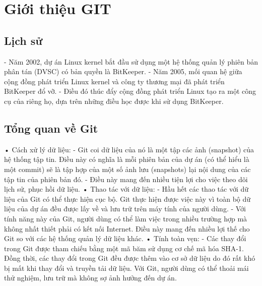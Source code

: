 \documentclass[12pt,a4paper]{report}
\begin{document}
\chapter{Giới thiệu GIT}


\section{Lịch sử}


\hspace{0.6cm}- Năm 2002, dự án Linux kernel bắt đầu sử dụng một hệ thống quản lý phiên bản phân tán (DVSC) có bản quyền là BitKeeper. \vskip 0.4cm
- Năm 2005, mối quan hệ giữa cộng đồng phát triển Linux kernel và công ty thương mại đã phát triển BitKeeper đổ vỡ.  \vskip 0.4cm
- Điều đó thúc đẩy cộng đồng phát triển Linux tạo ra một công cụ của riêng họ, dựa trên những điều học được khi sử dụng BitKeeper. \vskip 0.4cm

\section{Tổng quan về Git}


\hspace{0.6cm}•	Cách xử lý dữ liệu:\vskip 0.4cm
- Git coi dữ liệu của nó là một tập các ảnh (snapshot) của hệ thống tập tin. Điều này có nghĩa là mỗi phiên bản của dự án (có thể hiểu là một commit) sẽ là tập hợp của một số ảnh lưu (snapshots) lại nội dung của các tập tin của phiên bản đó.\vskip 0.4cm
- Điều này mang đến nhiều tiện lợi cho việc theo dõi lịch sử, phục hồi dữ liệu. \vskip 0.4cm
•	Thao tác với dữ liệu:\vskip 0.4cm
- Hầu hết các thao tác với dữ liệu của Git có thể thực hiện cục bộ. Git thực hiện được việc này vì toàn bộ dữ liệu của dự án đều được lấy về và lưu trữ trên máy tính của người dùng.\vskip 0.4cm
- Với tính năng này của Git, người dùng có thể làm việc trong nhiều trường hợp mà không nhất thiết phải có kết nối Internet. Điều này mang đến nhiều lợi thế cho Git so với các hệ thống quản lý dữ liệu khác.\vskip 0.4cm
•	Tính toàn vẹn:\vskip 0.4cm
- Các thay đổi trong Git được tham chiếu bằng một mã băm sử dụng cơ chế mã hóa SHA-1. Đồng thời, các thay đổi trong Git đều được thêm vào cơ sở dữ liệu do đó rất khó bị mất khi thay đổi và truyền tải dữ liệu. Với Git, người dùng có thể thoải mái thử nghiệm, lưu trữ mà không sợ ảnh hưởng đến dự án.\vskip 0.4cm
\end{document}
